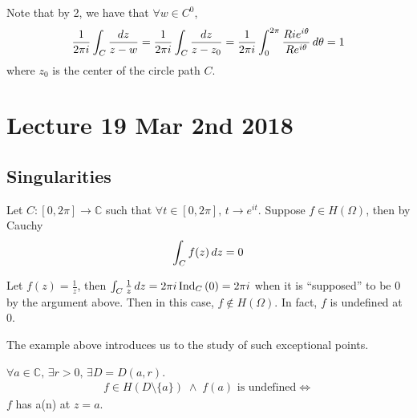 \documentclass[notoc,notitlepage]{tufte-book}
\begin{document}
\begin{remark}
	Note that by 2, we have that $\forall w \in C^0$,
	\begin{equation*}
		\frac{1}{2 \pi i} \int_{C} \frac{\dif{z}}{z - w} = \frac{1}{2 \pi i} \int_{C} \frac{\dif{z}}{z - z_0} = \frac{1}{2 \pi i } \int_{0}^{2 \pi} \frac{Rie^{i \theta}}{Re^{i \theta}} \dif{\theta} = 1  
	\end{equation*}
	where $z_0$ is the center of the circle path $C$.
\end{remark}



\chapter{Lecture 19 Mar 2nd 2018}
	\label{chapter:lecture_19_mar_2nd_2018}

\section{Singularities} %
\label{sec:singularities}

\begin{ex}
	Let $C : [0, 2 \pi] \to \mathbb{C}$ such that $\forall t \in [0, 2 \pi], \, t \to e^{it}$. Suppose $f \in H(\Omega)$, then by Cauchy
	\begin{equation*}
		\int_{C} f(z) \dif{z} = 0
	\end{equation*}

	Let $f(z) = \frac{1}{z}$, then $\int_{C} \frac{1}{z} \dif{z} = 2 \pi i \ind{0}{C} = 2 \pi i$ when it is ``supposed'' to be $0$ by the argument above. Then in this case, $f \notin H(\Omega)$. In fact, $f$ is undefined at $0$.
\end{ex}

The example above introduces us to the study of such exceptional points.

\begin{defn}\label{defn:singularity}
	$\forall a \in \mathbb{C}, \, \exists r > 0 , \, \exists D = D(a, r)$.
	\begin{gather*}
		f \in H(D \setminus \{a\}) \; \land \; f(a) \text{ is undefined} \iff
	\end{gather*}
	$f$ has a(n)  at $z = a$.
\end{defn}
\end{document}

